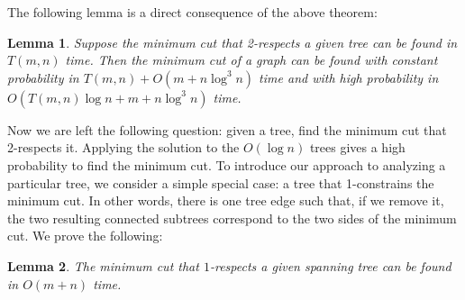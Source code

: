 \documentclass[11pt]{article}
\theoremstyle{plain}
\newtheorem{lemma}{Lemma}[section]
\begin{document}
The following lemma is a direct consequence of the above theorem:
\begin{lemma}
    \label{lemma:2respect}
    Suppose the minimum cut that 2-respects a given tree can be found in $T(m,n)$ time.  Then the minimum cut of a graph can be found with constant probability in $T(m,n)+O(m+n\log^3 n)$ time and with high probability in $O(T(m,n)\log n+m+n\log^3 n)$ time.
\end{lemma}

Now we are left the following question: given a tree, find the minimum cut that 2-respects it. Applying the solution to the $O(\log n)$ trees gives a high probability to find the minimum cut. To introduce our approach to analyzing a particular tree, we consider a simple special case: a tree that 1-constrains the minimum cut. In other words, there is one tree edge such that, if we remove it, the two resulting connected subtrees correspond to the two sides of the minimum cut. We prove the following:

\begin{lemma}
    The minimum cut that $1$-respects a given spanning tree can be found in $O(m+n)$ time.
\end{lemma}
\end{document}
